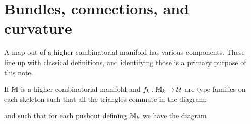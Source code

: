 \section{Bundles, connections, and curvature}
A map out of a higher combinatorial manifold has various components. These line up with classical definitions, and identifying those is a primary purpose of this note.

\begin{mydef}
\label{def:connection}
If \( \mathbb{M} \) is a higher combinatorial manifold and \( f_k:\mathbb{M}_k\to\mathcal{U} \) are type families on each skeleton such that all the triangles commute in the diagram:
\end{mydef}
\begin{center}
\end{center}
and such that for each pushout defining \( \mathbb{M}_k \) we have the diagram
